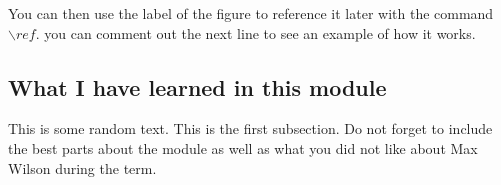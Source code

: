 
You can then use the label of the figure to reference it later with the command ${\backslash}ref$. you can comment out the next line to see an example of how it works.


\subsection{What I have learned in this module}
This is some random text.
This is the first subsection. Do not forget to include the best parts about the module as well as what you did not like about Max Wilson during the term.
